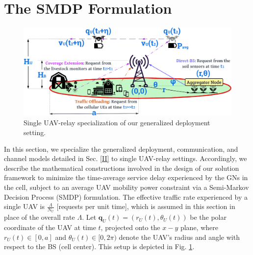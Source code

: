 \documentclass[10pt,twocolumn]{IEEEtran}
\begin{document}
\section{The SMDP Formulation}\label{III}
\begin{figure} [t]
    \centering
    \includegraphics[width=1.0\linewidth]{figs/Deployment_Model_Single_Agent_Specialization.png}
    \vspace{-6mm}
    \caption{Single UAV-relay specialization of our generalized deployment setting.}
    \vspace{-6mm}
    \label{F4}
\end{figure}
In this section, we specialize the generalized deployment, communication, and channel models detailed in Sec. \ref{II} to single UAV-relay settings. Accordingly, we describe the mathematical constructions involved in the design of our solution framework to minimize the time-average service delay experienced by the GNs in the cell, subject to an average UAV mobility power constraint via a Semi-Markov Decision Process (SMDP) formulation. The effective traffic rate experienced by a single UAV is $\frac{\Lambda}{N_U}$ [requests per unit time], which is assumed in this section in place of the overall rate $\Lambda$. Let $\mathbf{q}_{U}(t){=}(r_{U}(t),\theta_{U}(t))$ be the polar coordinate of the UAV at time $t$, projected onto the $x{-}y$ plane, where $r_{U}(t){\in}[0,a]$ and $\theta_{U}(t){\in}[0,2\pi)$ denote the UAV's radius and angle with respect to the BS (cell center). This setup is depicted in Fig. \ref{F4}.
\end{document}
